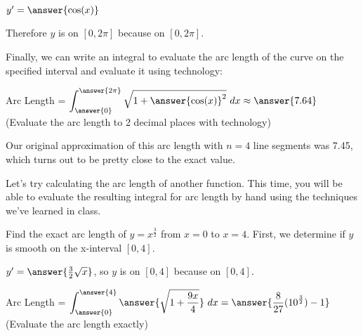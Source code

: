 \documentclass[handout,nooutcomes]{ximera}
\begin{document}
\begin{problem}

$y' = \answer{\cos(x)}$

\begin{problem}

Therefore $y$ is  on $[0,2\pi]$ because  on $[0,2\pi]$.  

\begin{problem}

Finally, we can write an integral to evaluate the arc length of the curve on the specified interval and evaluate it using technology: 

Arc Length = $\displaystyle\int_{\answer{0}}^{\answer{2\pi}} \sqrt{1+{\answer{\cos(x)}^2}} \ dx \approx \answer{7.64}$ (Evaluate the arc length to 2 decimal places with technology)

\begin{feedback}[correct]
Our original approximation of this arc length with $n=4$ line segments was 7.45, which turns out to be pretty close to the exact value. 
\end{feedback}


\end{problem}
\end{problem}
\end{problem}

Let's try calculating the arc length of another function.  This time, you will be able to evaluate the resulting integral for arc length by hand using the techniques we've learned in class.


\begin{problem}

Find the exact arc length of $y = x^{\frac{3}{2}}$ from $x=0$ to $x=4$.  First, we determine if $y$ is smooth on the x-interval $[0,4]$.  

$y' = \answer{\frac{3}{2}\sqrt{x}}$, so $y$ is  on $[0,4]$ because  on $[0,4]$.  

\begin{problem}

Arc Length = $\displaystyle\int_{\answer{0}}^{\answer{4}} \answer{\sqrt{1+\frac{9x}{4}}} \ dx = \answer{\frac{8}{27}(10^{\frac{3}{2}})-1}$ (Evaluate the arc length exactly)

\end{problem}
\end{problem}
\end{document}
